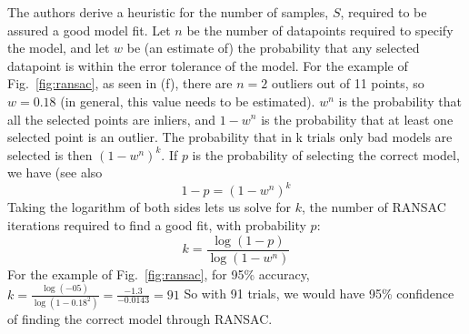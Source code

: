 The authors derive a heuristic for the number of samples, $S$, required to be assured a good model fit.  Let $n$ be the number of datapoints required to specify the model, and let $w$ be (an estimate of) the probability that any selected datapoint is within the error tolerance of the model.   For the example of Fig.~\ref{fig:ransac}, as seen in (f), there are $n=2$ outliers out of 11 points, so $w = 0.18$ (in general, this value needs to be estimated).  $w^n$ is the probability that all the selected points are inliers, and $1 -  w^n$ is the probability that at least one selected point is an outlier.  The probability that in k trials only bad models are selected is then $(1 -  w^n)^k$.  If $p$ is the probability of selecting the correct model, we have (see also \cite{wikiRANSAC}
\begin{equation}
    1-p = (1 -  w^n)^k
\end{equation}
Taking the logarithm of both sides lets us solve for $k$, the number of RANSAC iterations required to find a good fit, with probability $p$:
\begin{equation}
    k = \frac{\log(1-p)}{\log(1-w^n)}
    \label{eq:k}
\end{equation}
For the example of Fig.~\ref{fig:ransac}, for 95\% accuracy, $k = \frac{\log(-05)}{\log(1-0.18^2)} = \frac{-1.3}{-0.0143} = 91$
So with 91 trials, we would have 95\% confidence of finding the correct model through RANSAC.


